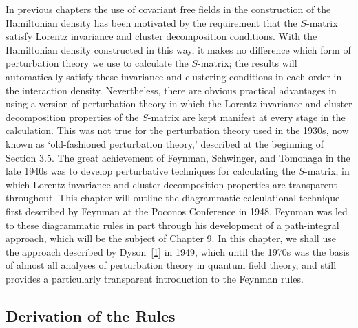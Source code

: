 
In previous chapters the use of covariant free fields in the construction
of the Hamiltonian density has been motivated by the requirement that
the $S$-matrix satisfy Lorentz invariance and cluster decomposition
conditions. With the Hamiltonian density constructed in this way, it makes
no difference which form of perturbation theory we use to calculate the
$S$-matrix; the results will automatically satisfy these invariance and
clustering conditions in each order in the interaction density. Nevertheless,
there are obvious practical advantages in using a version of perturbation
theory in which the Lorentz invariance and cluster decomposition properties
of the $S$-matrix are kept manifest at every stage in the calculation. This
was not true for the perturbation theory used in the 1930s, now known as
`old-fashioned perturbation theory,' described at the beginning of Section
3.5. The great achievement of Feynman, Schwinger, and Tomonaga in the late
1940s was to develop perturbative techniques for calculating the $S$-matrix,
in which Lorentz invariance and cluster decomposition properties are
transparent throughout. This chapter will outline the diagrammatic
calculational technique first described by Feynman at the Poconos Conference
in 1948. Feynman was led to these diagrammatic rules in part through his
development of a path-integral approach, which will be the subject of Chapter
9. In this chapter, we shall use the approach described by Dyson~\hyperref[ref:6.1]{[1]} in 1949,
which until the 1970s was the basis of almost all analyses of perturbation
theory in quantum field theory, and still provides a particularly transparent
introduction to the Feynman rules.

\subsection{Derivation of the Rules}

